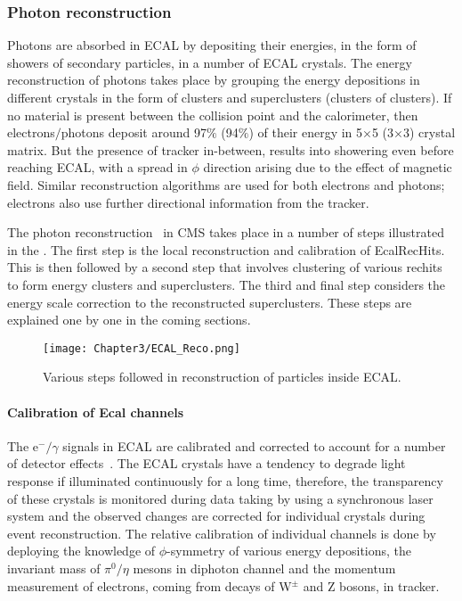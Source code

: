 \subsubsection{Photon reconstruction}
Photons are absorbed in ECAL by depositing their energies, 
in the form of showers of secondary particles, in a number of ECAL crystals. The energy reconstruction of photons
takes place by grouping the energy depositions in different crystals in the form of clusters and superclusters (clusters of clusters).
If no material is present between the collision point and the calorimeter, then
electrons$/$photons deposit around 97$\%$ (94$\%$) of their energy in 5$\times$5 (3$\times$3) crystal matrix. But the presence of tracker in-between, results
into showering even before reaching ECAL, with a spread in $\phi$ direction arising due to the effect of magnetic field. 
Similar reconstruction algorithms are used for both electrons and photons; electrons also use further directional information from the tracker. 

The photon reconstruction~\cite{Khachatryan:2015iwa, Anderson:1365024} in CMS takes place in a number of steps
illustrated in the \fig{\ref{fig:ECAL_Reco}}. The first step
is the local reconstruction and calibration of EcalRecHits. This is then followed by a second step that involves clustering of various rechits to form energy clusters
and superclusters. The third and final step considers the energy scale correction to the reconstructed superclusters.
These steps are explained one by one in the coming sections.

\begin{figure}[h]
\begin{center}
\texttt{[image: Chapter3/ECAL\_Reco.png]}
\caption{Various steps followed in reconstruction of particles inside ECAL.}
\label{fig:ECAL_Reco}
\end{center}
\end{figure}
\vspace{-0.3in}

\paragraph{Calibration of Ecal channels}\label{para:Calib}
\hspace{\parindent} The e$^{-}/\gamma$ signals in ECAL are calibrated and corrected to account for a number of detector effects~\cite{Chatrchyan:2013dga}.
The ECAL crystals have a tendency to degrade light response if illuminated continuously for a long time, therefore, the transparency of these crystals is
monitored during data taking by using a synchronous laser system and the observed changes are corrected for individual crystals during event reconstruction.
The relative calibration of individual channels is done by deploying the knowledge of $\phi$-symmetry of various energy depositions, the invariant mass of
$\pi^{0}/\eta$ mesons in diphoton channel and the momentum measurement of electrons, coming from decays of W$^{\pm}$ and Z bosons, in tracker.

